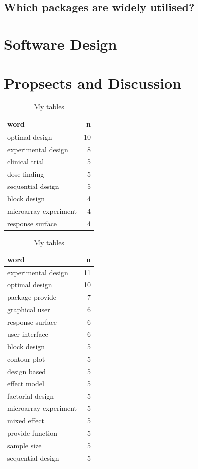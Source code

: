 \hypertarget{which-packages-are-widely-utilised}{%
\subsection{Which packages are widely
utilised?}\label{which-packages-are-widely-utilised}}

\hypertarget{software-design}{%
\section{Software Design}\label{software-design}}

\hypertarget{propsects-and-discussion}{%
\section{Propsects and Discussion}\label{propsects-and-discussion}}

\newpage

\begin{table}[h] \centering  
\begin{tabular}[t]{lr}
\toprule
word & n\\
\midrule
optimal design & 10\\
experimental design & 8\\
clinical trial & 5\\
dose finding & 5\\
sequential design & 5\\
block design & 4\\
microarray experiment & 4\\
response surface & 4\\
\bottomrule
\end{tabular} \hspace{1cm} \centering  
\begin{tabular}[t]{lr}
\toprule
word & n\\
\midrule
experimental design & 11\\
optimal design & 10\\
package provide & 7\\
graphical user & 6\\
response surface & 6\\
user interface & 6\\
block design & 5\\
contour plot & 5\\
design based & 5\\
effect model & 5\\
factorial design & 5\\
microarray experiment & 5\\
mixed effect & 5\\
provide function & 5\\
sample size & 5\\
sequential design & 5\\
\bottomrule
\end{tabular} \caption{My tables} \end{table}

